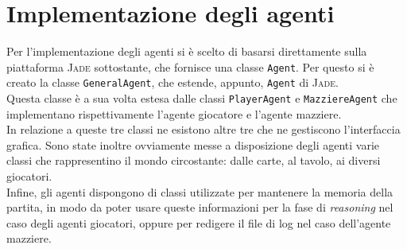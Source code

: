 \chapter*{Implementazione degli agenti}
\graphicspath{{Chapter5/Chapter5Figs/PNG/}{Chapter5/Chapter5Figs/PDF/}{Chapter5/Chapter5Figs/}}



Per l'implementazione degli agenti si è scelto di basarsi direttamente sulla piattaforma \textsc{Jade} sottostante, che fornisce una classe \texttt{Agent}.
Per questo si è creato la classe \texttt{GeneralAgent}, che estende, appunto, \texttt{Agent} di \textsc{Jade}.\\
Questa classe è a sua volta estesa dalle classi \texttt{PlayerAgent} e \texttt{MazziereAgent} che implementano rispettivamente l'agente giocatore e l'agente mazziere.\\
In relazione a queste tre classi ne esistono altre tre che ne gestiscono l'interfaccia grafica.
Sono state inoltre ovviamente messe a disposizione degli agenti varie classi che rappresentino il mondo circostante: dalle carte, al tavolo, ai diversi giocatori.\\
Infine, gli agenti dispongono di classi utilizzate per mantenere la memoria della partita, in modo da poter usare queste informazioni per la fase di \emph{reasoning} nel caso degli agenti giocatori, oppure per redigere il file di log nel caso dell'agente mazziere.

